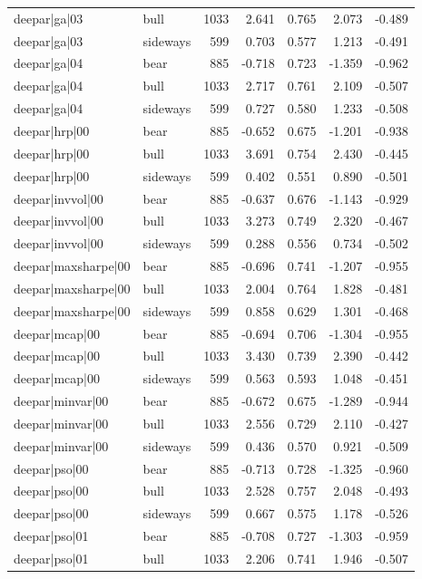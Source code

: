 \begin{table}
\begin{tabular}{llrrrrr}
deepar|ga|03 & bull & 1033 & 2.641 & 0.765 & 2.073 & -0.489 \\
deepar|ga|03 & sideways & 599 & 0.703 & 0.577 & 1.213 & -0.491 \\
deepar|ga|04 & bear & 885 & -0.718 & 0.723 & -1.359 & -0.962 \\
deepar|ga|04 & bull & 1033 & 2.717 & 0.761 & 2.109 & -0.507 \\
deepar|ga|04 & sideways & 599 & 0.727 & 0.580 & 1.233 & -0.508 \\
deepar|hrp|00 & bear & 885 & -0.652 & 0.675 & -1.201 & -0.938 \\
deepar|hrp|00 & bull & 1033 & 3.691 & 0.754 & 2.430 & -0.445 \\
deepar|hrp|00 & sideways & 599 & 0.402 & 0.551 & 0.890 & -0.501 \\
deepar|invvol|00 & bear & 885 & -0.637 & 0.676 & -1.143 & -0.929 \\
deepar|invvol|00 & bull & 1033 & 3.273 & 0.749 & 2.320 & -0.467 \\
deepar|invvol|00 & sideways & 599 & 0.288 & 0.556 & 0.734 & -0.502 \\
deepar|maxsharpe|00 & bear & 885 & -0.696 & 0.741 & -1.207 & -0.955 \\
deepar|maxsharpe|00 & bull & 1033 & 2.004 & 0.764 & 1.828 & -0.481 \\
deepar|maxsharpe|00 & sideways & 599 & 0.858 & 0.629 & 1.301 & -0.468 \\
deepar|mcap|00 & bear & 885 & -0.694 & 0.706 & -1.304 & -0.955 \\
deepar|mcap|00 & bull & 1033 & 3.430 & 0.739 & 2.390 & -0.442 \\
deepar|mcap|00 & sideways & 599 & 0.563 & 0.593 & 1.048 & -0.451 \\
deepar|minvar|00 & bear & 885 & -0.672 & 0.675 & -1.289 & -0.944 \\
deepar|minvar|00 & bull & 1033 & 2.556 & 0.729 & 2.110 & -0.427 \\
deepar|minvar|00 & sideways & 599 & 0.436 & 0.570 & 0.921 & -0.509 \\
deepar|pso|00 & bear & 885 & -0.713 & 0.728 & -1.325 & -0.960 \\
deepar|pso|00 & bull & 1033 & 2.528 & 0.757 & 2.048 & -0.493 \\
deepar|pso|00 & sideways & 599 & 0.667 & 0.575 & 1.178 & -0.526 \\
deepar|pso|01 & bear & 885 & -0.708 & 0.727 & -1.303 & -0.959 \\
deepar|pso|01 & bull & 1033 & 2.206 & 0.741 & 1.946 & -0.507 \\

\end{tabular}
\end{table}
